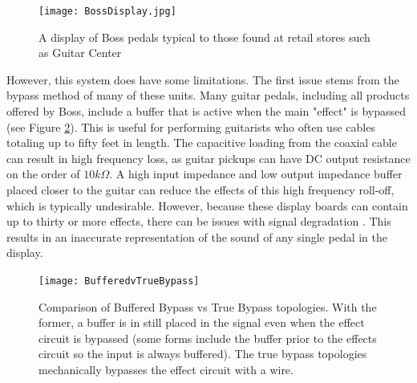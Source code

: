 \documentclass{article}
\begin{document}
	\begin{figure}
		\centering
		\texttt{[image: BossDisplay.jpg]}
		\caption{A display of Boss pedals typical to those found at retail stores such as Guitar Center \cite{BossDisplayPhoto}}
		\label{fig:BossDisplay}
	\end{figure}

	However, this system does have some limitations.  The first issue stems from the bypass method of many of these units.  Many guitar pedals, including all products offered by Boss, include a buffer that is active when the main "effect" is bypassed (see Figure \ref{fig:BufferedBypassConfig}).  This is useful for performing guitarists who often use cables totaling up to fifty feet in length.  The capacitive loading from the coaxial cable can result in high frequency loss, as guitar pickups can have DC output resistance on the order of $10k\Omega$.  A high input impedance and low output impedance buffer placed closer to the guitar can reduce the effects of this high frequency roll-off, which is typically undesirable.  However, because these display boards can contain up to thirty or more effects, there can be issues with signal degradation \cite{OrmanBypassMeasurements}.  This results in an inaccurate representation of the sound of any single pedal in the display.

	\begin{figure}
		\centering
		\texttt{[image: BufferedvTrueBypass]}
		\caption{Comparison of Buffered Bypass vs True Bypass topologies.  With the former, a buffer is in still placed in the signal even when the effect circuit is bypassed (some forms include the buffer prior to the effects circuit so the input is always buffered).  The true bypass topologies mechanically bypasses the effect circuit with a wire.}
		\label{fig:BufferedBypassConfig}
	\end{figure}
\end{document}
